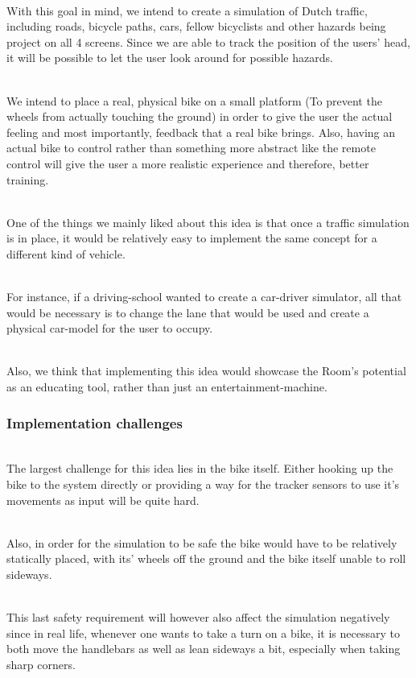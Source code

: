 \documentclass[11pt]{article}
\begin{document}
~\\
With this goal in mind, we intend to create a simulation of Dutch traffic, including roads, bicycle paths, cars, fellow bicyclists and other hazards being project on all 4 screens. Since we are able to track the position of the users' head, it will be possible to let the user look around for possible hazards. 

~\\
We intend to place a real, physical bike on a small platform (To prevent the wheels from actually touching the ground) in order to give the user the actual feeling and most importantly, feedback that a real bike brings. Also, having an actual bike to control rather than something more abstract like the remote control will give the user a more realistic experience and therefore, better training.

~\\
One of the things we mainly liked about this idea is that once a traffic simulation is in place, it would be relatively easy to implement the same concept for a different kind of vehicle.

~\\
For instance, if a driving-school wanted to create a car-driver simulator, all that would be necessary is to change the lane that would be used and create a physical car-model for the user to occupy.

~\\
Also, we think that implementing this idea would showcase the Room's potential as an educating tool, rather than just an entertainment-machine.

\newpage
{}
\subsubsection*{Implementation challenges}
~\\
The largest challenge for this idea lies in the bike itself. Either hooking up the bike to the system directly or providing a way for the tracker sensors to use it's movements as input will be quite hard. 

~\\
Also, in order for the simulation to be safe the bike would have to be relatively statically placed, with its' wheels off the ground and the bike itself unable to roll sideways. 

~\\
This last safety requirement will however also affect the simulation negatively since in real life, whenever one wants to take a turn on a bike, it is necessary to both move the handlebars as well as lean sideways a bit, especially when taking sharp corners.
\end{document}
